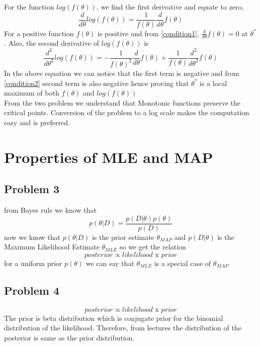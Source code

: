\documentclass[5pt,a4paper]{article}
\begin{document}
For the function $log (f(\theta))$, we find the first derivative and equate to zero,
\begin{equation*}
\frac{d }{d \theta}log(f(\theta))= \frac{1}{f(\theta)}\frac{d}{d\theta}f(\theta)
\end{equation*}
For a positive function $f(\theta)$ is positive and from \ref{condition1}, $\frac{d}{d\theta}f(\theta)= 0$ at $\theta^*$. Also, the second derivative of $log (f(\theta))$ is  
\begin{equation*}
\frac{d^2 }{d \theta^2}log(f(\theta))= -\frac{1}{f(\theta)^2}\frac{d}{d\theta} f(\theta) + \frac{1}{ f(\theta)}\frac{d^2}{d \theta^2} f(\theta)
\end{equation*}
 In the above equation we can notice that the first term is negative and from \ref{condition2} second term is also negative hence proving that $\theta^*$ is a local maximum of both $f(\theta)$ and $log(f(\theta))$\\
	
From the two problem we understand that Monotonic functions preserve the critical points. Conversion of the problem to a log scale makes the computation easy and is preferred. 

\section{Properties of MLE and MAP}
\subsection*{Problem 3} 
 from Bayes rule we know that 
 \begin{equation}
 p(\theta |D) = \frac{p(D|\theta)p(\theta)}{p(D)}
 \end{equation}
 now we know that $p(\theta |D)$ is the prior estimate $\theta_{MAP}$ and $p(D|\theta)$ is the Maximum Likelihood Estimate $\theta_{MLE}$ so we get the relation 
 \begin{equation*}
 	posterior \propto likelihood \text{ x } prior
 \end{equation*}
for a uniform prior $p(\theta)$ we can say that $\theta_{MLE}$ is a special case of $\theta_{MAP}$

\subsection*{Problem 4}
\begin{equation*}
posterior \propto likelihood \text{ x } prior
\end{equation*}
The prior is beta distribution which is conjugate prior for the binomial distribution of the likelihood. Therefore, from lectures the distribution of the posterior is same as the prior distribution.
\end{document}
